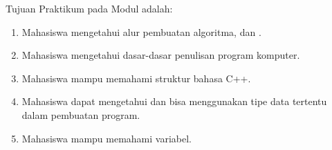 \documentclass[../main.tex]{subfiles}
\begin{document}
    \noindent Tujuan Praktikum pada Modul {} {\leftmark} adalah:
    \begin{enumerate}
        \item Mahasiswa mengetahui alur pembuatan algoritma, {\pseudocode} dan {\flowchart}.
        \item Mahasiswa mengetahui dasar-dasar penulisan program komputer.
        \item Mahasiswa mampu memahami struktur bahasa C++.
        \item Mahasiswa dapat mengetahui dan bisa menggunakan tipe data tertentu dalam pembuatan program.
        \item Mahasiswa mampu memahami {\typecasting} variabel.
    \end{enumerate}
\end{document}
